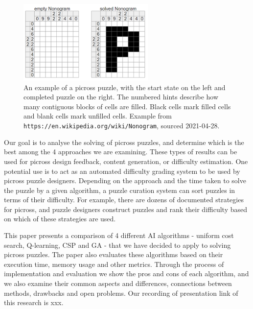 \documentclass{svproc}
\begin{document}
\begin{figure}[h]
  \centering
  \includegraphics[width=0.6\textwidth]{picross1.png}
  \caption{An example of a picross puzzle, with the start state on the left and completed puzzle on the right. The numbered hints describe how many contiguous blocks of cells are filled. Black cells mark filled cells and blank cells mark unfilled cells. Example from \texttt{https://en.wikipedia.org/wiki/Nonogram}, sourced 2021-04-28.}
\end{figure}

Our goal is to analyse the solving of picross puzzles, and determine which is the best among the 4 approaches we are examining. These types of results can be used for picross design feedback, content generation, or difficulty estimation.
One potential use is to act as an automated difficulty grading system to be used by picross puzzle designers. Depending on the approach and the time taken to solve the puzzle by a given algorithm, a puzzle curation system can sort puzzles in terms of their difficulty.
For example, there are dozens of documented strategies for picross\cite{picross1}, and puzzle designers construct puzzles and rank their difficulty based on which of these strategies are used\cite{picross2}.

This paper presents a comparison of 4 different AI algorithms - uniform cost search, Q-learning, CSP and GA - that we  have decided to apply to solving picross puzzles.
The paper also evaluates these algorithms based on their execution time, memory usage and other metrics.
Through the process of implementation and evaluation we show the pros and cons of each algorithm, and we also examine their common aspects and differences, connections between methods, drawbacks and open problems.
Our recording of presentation link of this research is xxx. 
\end{document}
